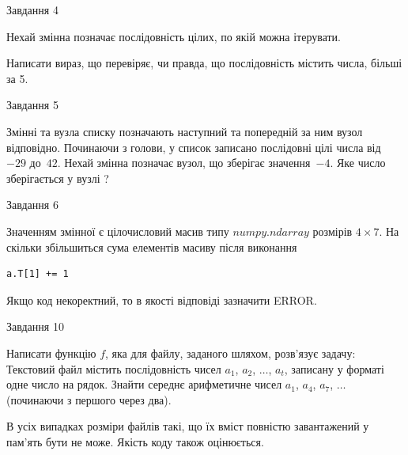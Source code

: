 \documentclass[12pt, ukrainian]{article}
\begin{document}
{\begin{minipage}[t]{8.0cm}
\end{minipage}


               
{\begin{center}Завдання {4}\end{center}}
\vspace{-4mm}
Нехай змінна  позначає послідовність цілих, по якій можна ітерувати.

Написати вираз, що перевіряє, чи правда, що послідовність  містить числа, більші за 5.\par

\vspace{10mm}
               
{\begin{center}Завдання {5}\end{center}}
\vspace{-4mm}
Змінні  та  вузла списку позначають наступний та попередній за ним вузол відповідно. Починаючи з голови, у список записано послідовні цілі числа від~$-29$ до~$42$. Нехай змінна  позначає вузол, що зберігає значення~$-4$.
Яке число зберігається у вузлі  ?\par

               
{\begin{center}Завдання {6}\end{center}}
\vspace{-4mm}
Значенням змінної  є цілочисловий масив типу $numpy.ndarray$ розмірів $4{\times}7$. На скільки збільшиться сума елементів масиву  після виконання
\begin{verbatim}
a.T[1] += 1
\end{verbatim}


Якщо код некоректний, то в якості відповіді зазначити ERROR.\par

               
{\begin{center}Завдання {10}\end{center}}
\vspace{-4mm}

Написати функцію $f$, яка для файлу, заданого шляхом, розв’язує задачу:\\ Текстовий файл містить послідовність чисел $a_1$, $a_2$, $\ldots$, $a_t$, записану у форматі одне число на рядок. Знайти середнє арифметичне чисел $a_1$, $a_4$, $a_7$, $\ldots$ (починаючи з першого через два).

В усіх випадках розміри файлів такі, що їх вміст повністю завантажений у пам'ять бути не може. Якість коду також оцінюється.



}
\end{document}
